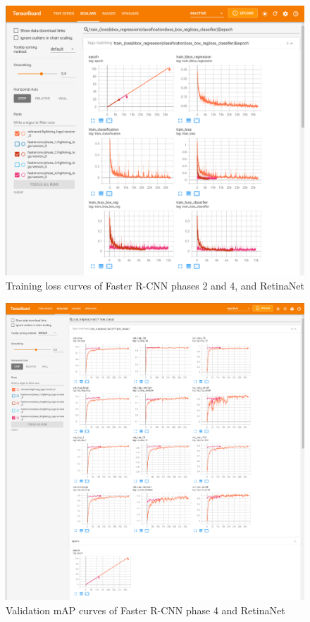 \documentclass{article}
\begin{document}
\begin{figure}[h]
    \centering
    \includegraphics[width=\textwidth]{tensorboard_screenshots/train_losses_p24r.png}
    \caption{Training loss curves of Faster R-CNN phases 2 and 4, and RetinaNet}
    \label{fig:train_losses_p24r}
\end{figure}

\begin{figure}[h]
    \centering
    \includegraphics[width=\textwidth]{tensorboard_screenshots/val_map.png}
    \caption{Validation mAP curves of Faster R-CNN phase 4 and RetinaNet}
    \label{fig:val_map}
\end{figure}
\end{document}
